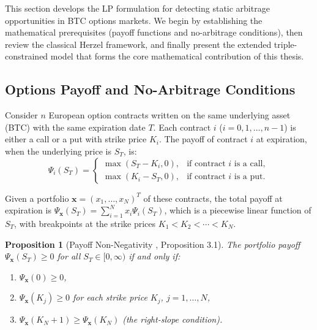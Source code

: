 \documentclass[openany]{book}
\numberwithin{figure}{chapter}
\numberwithin{equation}{chapter}
\newtheorem{proposition}[theorem]{Proposition}
\begin{document}
This section develops the LP formulation for detecting static arbitrage opportunities in BTC options markets. We begin by establishing the mathematical prerequisites (payoff functions and no-arbitrage conditions), then review the classical Herzel \cite{herzel2005} framework, and finally present the extended triple-constrained model that forms the core mathematical contribution of this thesis.

\subsection{Options Payoff and No-Arbitrage Conditions}

Consider $n$ European option contracts written on the same underlying asset (BTC) with the same expiration date $T$. Each contract $i$ ($i = 0, 1, \ldots, n-1$) is either a call or a put with strike price $K_i$. The payoff of contract $i$ at expiration, when the underlying price is $S_T$, is:
\begin{equation}
\Psi_i(S_T) = \begin{cases}
\max(S_T - K_i, 0), & \text{if contract } i \text{ is a call}, \\
\max(K_i - S_T, 0), & \text{if contract } i \text{ is a put}.
\end{cases}
\label{eq:payoff}
\end{equation}

Given a portfolio $\mathbf{x} = (x_1, \ldots, x_N)^T$ of these contracts, the total payoff at expiration is $\Psi_{\mathbf{x}}(S_T) = \sum_{i=1}^{N} x_i \Psi_i(S_T)$, which is a piecewise linear function of $S_T$, with breakpoints at the strike prices $K_1 < K_2 < \cdots < K_N$.

\begin{proposition}[Payoff Non-Negativity {\cite{herzel2005}, Proposition 3.1}]
\label{prop:payoff_nonneg}
The portfolio payoff $\Psi_{\mathbf{x}}(S_T) \geq 0$ for all $S_T \in [0, \infty)$ if and only if:
\begin{enumerate}
    \item $\Psi_{\mathbf{x}}(0) \geq 0$,
    \item $\Psi_{\mathbf{x}}(K_j) \geq 0$ for each strike price $K_j$, $j = 1, \ldots, N$,
    \item $\Psi_{\mathbf{x}}(K_N + 1) \geq \Psi_{\mathbf{x}}(K_N)$ \;\; (the right-slope condition).
\end{enumerate}
\end{proposition}
\end{document}
